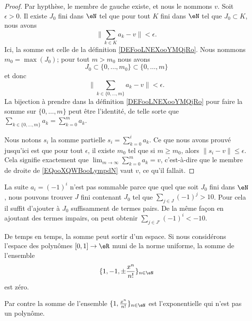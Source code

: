 \begin{proof}
	Par hypthèse, le membre de gauche existe, et nous le nommons \( v\). Soit \( \epsilon>0\). Il existe \( J_0\) fini dans \( \eN\) tel que pour tout \( K\) fini dans \( \eN\) tel que \( J_0\subset K\), nous avons
	\begin{equation}
		\| \sum_{k\in K}a_k-v \|<\epsilon.
	\end{equation}
	Ici, la somme est celle de la définition \ref{DEFooLNEXooYMQjRo}. Nous nommons \( m_0=\max(J_0)\); pour tout \( m>m_0\) nous avons
	\begin{equation}
		J_0\subset \{ 0,\ldots,m_0 \}\subset\{ 0,\ldots,m \}
	\end{equation}
	et donc
	\begin{equation}
		\| \sum_{k\in \{ 0,\ldots,m \}}a_k-v \|<\epsilon.
	\end{equation}
	La bijection à prendre dans la définition \eqref{DEFooLNEXooYMQjRo} pour faire la somme sur \( \{ 0,\ldots,m \}\) peut être l'identité, de telle sorte que \( \sum_{k\in\{ 0,\ldots,m \}}a_k=\sum_{k=0}^ma_k\).

	Nous notons \( s_i\) la somme partielle \( s_i=\sum_{k=0}^ia_k\). Ce que nous avons prouvé jusqu'ici est que pour tout \( \epsilon\), il existe \( m_0\) tel que si \( m\geq m_0\), alors \( \| s_i-v \|\leq \epsilon\). Cela signifie exactement que \( \lim_{m\to\infty}\sum_{k=0}^ma_k=v\), c'est-à-dire que le membre de droite de \eqref{EQooXQWBooLympdN} vaut \( v\), ce qu'il fallait.
\end{proof}

\begin{example}
	La suite \( a_i=(-1)^i\) n'est pas sommable parce que quel que soit \( J_0\) fini dans \( \eN\), nous pouvons trouver \( J\) fini contenant \( J_0\) tel que \( \sum_{j\in J}(-1)^j>10\). Pour cela il suffit d'ajouter à \( J_0\) suffisamment de termes pairs. De la même façon en ajoutant des termes impairs, on peut obtenir \( \sum_{j\in J'}(-1)^i<-10\).
\end{example}

\begin{example}
	De temps en temps, la somme peut sortir d'un espace. Si nous considérons l'espace des polynômes \( \mathopen[ 0 , 1 \mathclose]\to \eR\) muni de la norme uniforme, la somme de l'ensemble
	\begin{equation}
		\{ 1,-1,\pm\frac{ x^n }{ n! } \}_{n\in \eN}
	\end{equation}
	est zéro.

	Par contre la somme de l'ensemble \( \{ 1,\frac{ x^n }{ n! } \}_{n\in \eN}\) est l'exponentielle qui n'est pas un polynôme.
\end{example}

